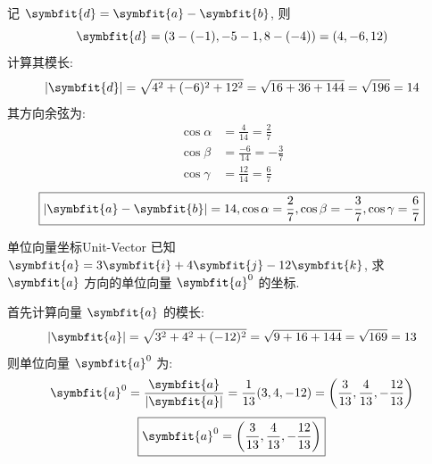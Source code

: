 \begin{solution}
    记 $\symbfit{d} = \symbfit{a} - \symbfit{b}$, 则
    \begin{equation}
        \symbfit{d} = (3 - (-1), -5 - 1, 8 - (-4)) = (4, -6, 12)
    \end{equation}
    计算其模长:
    \begin{equation}
        |\symbfit{d}| = \sqrt{4^2 + (-6)^2 + 12^2} = \sqrt{16 + 36 + 144} = \sqrt{196} = 14
    \end{equation}
    其方向余弦为:
    \begin{equation}
        \begin{aligned}
            \cos \alpha & = \frac{4}{14} = \frac{2}{7}   \\
            \cos \beta  & = \frac{-6}{14} = -\frac{3}{7} \\
            \cos \gamma & = \frac{12}{14} = \frac{6}{7}
        \end{aligned}
    \end{equation}
    \begin{equation}
        \boxed{|\symbfit{a} - \symbfit{b}| = 14, \cos \alpha = \frac{2}{7}, \cos \beta = -\frac{3}{7}, \cos \gamma = \frac{6}{7}}
    \end{equation}
\end{solution}


\begin{problem}{单位向量坐标}{Unit-Vector}
    已知 $\symbfit{a} = 3\symbfit{i} + 4\symbfit{j} - 12\symbfit{k}$, 求 $\symbfit{a}$ 方向的单位向量 $\symbfit{a}^0$ 的坐标.
\end{problem}

\begin{solution}
    首先计算向量 $\symbfit{a}$ 的模长:
    \begin{equation}
        |\symbfit{a}| = \sqrt{3^2 + 4^2 + (-12)^2} = \sqrt{9 + 16 + 144} = \sqrt{169} = 13
    \end{equation}
    则单位向量 $\symbfit{a}^0$ 为:
    \begin{equation}
        \symbfit{a}^0 = \frac{\symbfit{a}}{|\symbfit{a}|} = \frac{1}{13} (3, 4, -12) = \left( \frac{3}{13}, \frac{4}{13}, -\frac{12}{13} \right)
    \end{equation}
    \begin{equation}
        \boxed{\symbfit{a}^0 = \left( \frac{3}{13}, \frac{4}{13}, -\frac{12}{13} \right)}
    \end{equation}
\end{solution}


